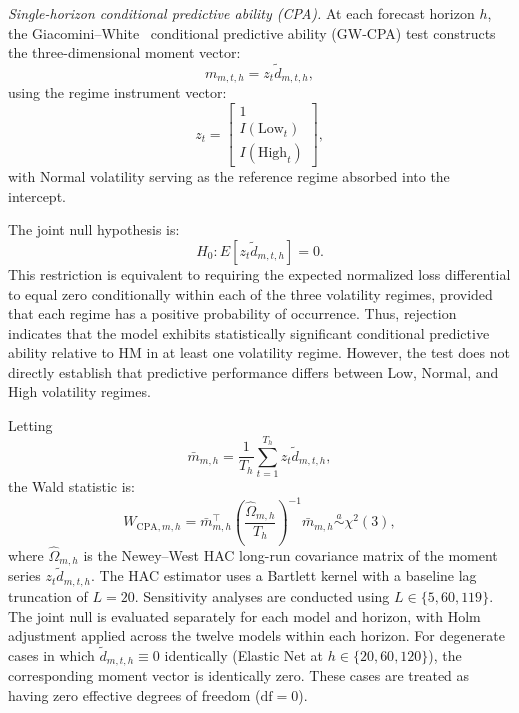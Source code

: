 \documentclass[runningheads,orivec]{llncs}
\begin{document}
\textit{Single-horizon conditional predictive ability (CPA).} At each forecast horizon $h$, the Giacomini--White~\cite{giacomini2006} conditional predictive ability (GW-CPA) test constructs the three-dimensional moment vector:
\begin{equation}
m_{m,t,h}=z_t\widetilde d_{m,t,h},
\end{equation}
using the regime instrument vector:
\begin{equation}
z_t=
\begin{bmatrix}
1\\
I(\mathrm{Low}_t)\\
I(\mathrm{High}_t)
\end{bmatrix},
\end{equation}
with Normal volatility serving as the reference regime absorbed into the intercept.

The joint null hypothesis is:
\begin{equation}
H_0: E[z_t\widetilde d_{m,t,h}]=0.
\end{equation}
This restriction is equivalent to requiring the expected normalized loss differential to equal zero conditionally within each of the three volatility regimes, provided that each regime has a positive probability of occurrence. Thus, rejection indicates that the model exhibits statistically significant conditional predictive ability relative to HM in at least one volatility regime. However, the test does not directly establish that predictive performance differs between Low, Normal, and High volatility regimes.

Letting
\begin{equation}
\bar m_{m,h} = \frac{1}{T_h}\sum_{t=1}^{T_h}z_t\widetilde d_{m,t,h},
\end{equation}
the Wald statistic is:
\begin{equation}
W_{\mathrm{CPA},m,h}
=
\bar m_{m,h}^{\top}
\left(
\frac{\widehat\Omega_{m,h}}{T_h}
\right)^{-1}
\bar m_{m,h}
\overset{a}{\sim}\chi^2(3),
\end{equation}
where $\widehat\Omega_{m,h}$ is the Newey--West HAC long-run covariance matrix of the moment series $z_t\widetilde d_{m,t,h}$. The HAC estimator uses a Bartlett kernel with a baseline lag truncation of $L=20$. Sensitivity analyses are conducted using $L\in\{5,60,119\}$. The joint null is evaluated separately for each model and horizon, with Holm adjustment applied across the twelve models within each horizon. For degenerate cases in which $\widetilde d_{m,t,h}\equiv 0$ identically (Elastic Net at $h\in\{20,60,120\}$), the corresponding moment vector is identically zero. These cases are treated as having zero effective degrees of freedom ($\mathrm{df}=0$).
\end{document}
